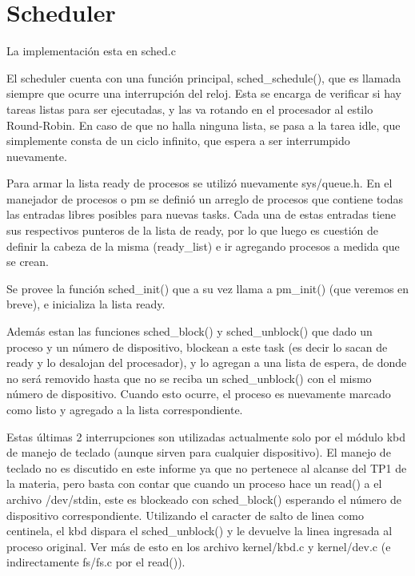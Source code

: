 \section{Scheduler}

La implementación esta en sched.c

El scheduler cuenta con una función principal, sched\_schedule(), que es
llamada siempre que ocurre una interrupción del reloj. Esta se encarga de
verificar si hay tareas listas para ser ejecutadas, y las va rotando en el
procesador al estilo Round-Robin. En caso de que no halla ninguna lista, se
pasa a la tarea idle, que simplemente consta de un ciclo infinito, que espera a
ser interrumpido nuevamente.

Para armar la lista ready de procesos se utilizó nuevamente sys/queue.h. En el
manejador de procesos o pm se definió un arreglo de procesos que contiene todas
las entradas libres posibles para nuevas tasks. Cada una de estas entradas
tiene sus respectivos punteros de la lista de ready, por lo que luego es
cuestión de definir la cabeza de la misma (ready\_list) e ir agregando procesos
a medida que se crean.

Se provee la función sched\_init() que a su vez llama a pm\_init() (que veremos
en breve), e inicializa la lista ready.

Además estan las funciones sched\_block() y sched\_unblock() que dado un
proceso y un número de dispositivo, blockean a este task (es decir lo sacan de
ready y lo desalojan del procesador), y lo agregan a una lista de espera, de
donde no será removido hasta que no se reciba un sched\_unblock() con el mismo
número de dispositivo. Cuando esto ocurre, el proceso es nuevamente marcado
como listo y agregado a la lista correspondiente.

Estas últimas 2 interrupciones son utilizadas actualmente solo por el módulo
kbd de manejo de teclado (aunque sirven para cualquier dispositivo). El manejo
de teclado no es discutido en este informe ya que no pertenece al alcanse del
TP1 de la materia, pero basta con contar que cuando un proceso hace un read() a
el archivo /dev/stdin, este es blockeado con sched\_block() esperando el número
de dispositivo correspondiente. Utilizando el caracter de salto de linea como
centinela, el kbd dispara el sched\_unblock() y le devuelve la linea ingresada
al proceso original. Ver más de esto en los archivo kernel/kbd.c y kernel/dev.c
(e indirectamente fs/fs.c por el read()).
